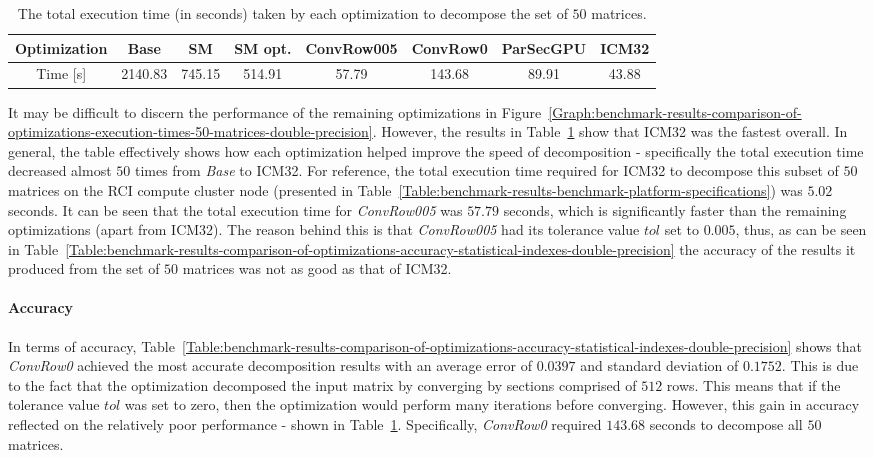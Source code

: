 \begin{table}[h!]
	\centering
	\renewcommand{\arraystretch}{1.5}
	\begin{tabular}{ |c|c|c|c|c|c|c|c| } 
		\hline
		Optimization & Base    & SM     & SM opt. & ConvRow005 & ConvRow0 & ParSecGPU & ICM32 \\
		\hline
		Time [s]     & 2140.83 & 745.15 & 514.91  & 57.79      & 143.68   &  89.91    & 43.88 \\
		\hline
	\end{tabular}
	\caption{The total execution time (in seconds) taken by each optimization to decompose the set of $ 50 $ matrices.}
	\label{Table:benchmark-results-comparison-of-optimizations-total-execution-time}
\end{table}

It may be difficult to discern the performance of the remaining optimizations in Figure~\ref{Graph:benchmark-results-comparison-of-optimizations-execution-times-50-matrices-double-precision}. However, the results in Table~\ref{Table:benchmark-results-comparison-of-optimizations-total-execution-time} show that ICM32 was the fastest overall. In general, the table effectively shows how each optimization helped improve the speed of decomposition - specifically the total execution time decreased almost $ 50 $ times from \textit{Base} to ICM32. For reference, the total execution time required for ICM32 to decompose this subset of $ 50 $ matrices on the RCI compute cluster node (presented in Table~\ref{Table:benchmark-results-benchmark-platform-specifications}) was $ 5.02 $ seconds.
It can be seen that the total execution time for \textit{ConvRow005} was $ 57.79 $ seconds, which is significantly faster than the remaining optimizations (apart from ICM32). The reason behind this is that \textit{ConvRow005} had its tolerance value $ tol $ set to $ 0.005 $, thus, as can be seen in Table~\ref{Table:benchmark-results-comparison-of-optimizations-accuracy-statistical-indexes-double-precision} the accuracy of the results it produced from the set of $ 50 $ matrices was not as good as that of ICM32.

\paragraph{Accuracy} In terms of accuracy, Table~\ref{Table:benchmark-results-comparison-of-optimizations-accuracy-statistical-indexes-double-precision} shows that \textit{ConvRow0} achieved the most accurate decomposition results with an average error of $ 0.0397 $ and standard deviation of $ 0.1752 $. This is due to the fact that the optimization decomposed the input matrix by converging by sections comprised of $ 512 $ rows. This means that if the tolerance value $ tol $ was set to zero, then the optimization would perform many iterations before converging. However, this gain in accuracy reflected on the relatively poor performance - shown in Table~\ref{Table:benchmark-results-comparison-of-optimizations-total-execution-time}. Specifically, \textit{ConvRow0} required $ 143.68 $ seconds to decompose all $ 50 $ matrices.

